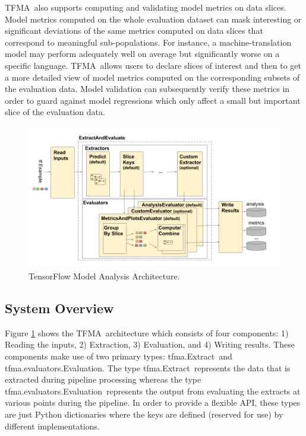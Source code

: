 \documentclass[11pt]{article}
\newcommand{\tfma}{{\sf TFMA}}
\newcommand{\extract}{{\sf tfma.Extract}}
\newcommand{\evaluation}{{\sf tfma.evaluators.Evaluation}}
\begin{document}
\tfma\ also supports computing and validating model metrics on data slices. Model metrics computed on the whole evaluation dataset can mask interesting or significant deviations of the same metrics computed on data slices that correspond to meaningful sub-populations. For instance, a machine-translation model may perform adequately well on average but significantly worse on a specific language. \tfma\ allows users to declare slices of interest and then to get a more detailed view of model metrics computed on the corresponding subsets of the evaluation data. Model validation can subsequently verify these metrics in order to guard against model regressions which only affect a small but important slice of the evaluation data.

\begin{figure}[t]
  \includegraphics[width=\linewidth]{submissions/continuous-pipelines/figs/tfma_pipeline.png}
  \caption{TensorFlow Model Analysis Architecture.}
  \label{tfmaarch}
\vspace{-4mm}
\end{figure}

\subsection{System Overview}
Figure \ref{tfmaarch} shows the \tfma\ architecture which consists of four components: 1) Reading the inputs, 2) Extraction, 3) Evaluation, and 4) Writing results. These components make use of two primary types: \extract\ and \evaluation. The type \extract\ represents the data that is extracted during pipeline processing whereas the type \evaluation\ represents the output from evaluating the extracts at various points during the pipeline. In order to provide a flexible API, these types are just Python dictionaries where the keys are defined (reserved for use) by different implementations.  
\end{document}
